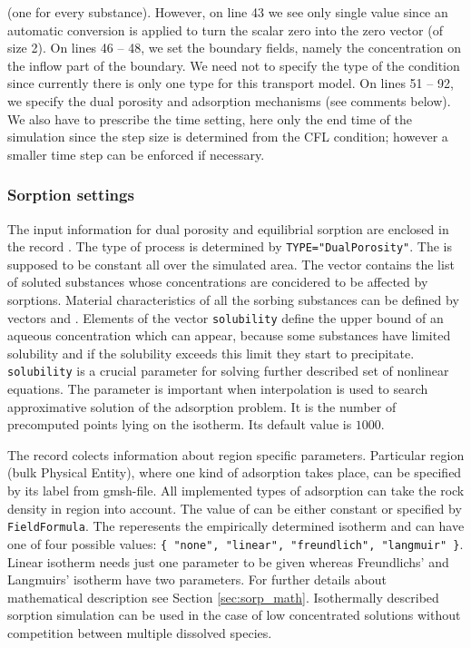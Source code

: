 \documentclass[12pt,a4paper]{report}
\begin{document}
(one for every substance). However, on line 43 we see only single value since an automatic conversion is applied to turn the scalar zero into the zero vector (of size 2). 
On lines 46 -- 48, we set the boundary fields, namely the concentration on the inflow part of the boundary.
We need not to specify the type of the condition since currently there is only one type for this transport model.
On lines 51 -- 92, we specify the dual porosity and adsorption mechanisms (see comments below).
We also have to prescribe the time setting, here only the end time of the simulation since the step size is determined from the CFL condition; however a smaller time step can be enforced if necessary.

\subsubsection{Sorption settings}\label{subsubsec:sorptions}
The input information for dual porosity and equilibrial sorption are enclosed in the record . The type of process is determined by {\tt TYPE="DualPorosity"}. The  is supposed to be constant all over the simulated area. The vector  contains the list of soluted substances whose concentrations are concidered to be affected by sorptions. Material characteristics of all the sorbing substances can be defined by vectors  and . Elements of the vector {\tt solubility} define the upper bound of an aqueous concentration which can appear, because some substances have limited solubility and if the solubility exceeds this limit they start to precipitate. {\tt solubility} is 
a crucial parameter for solving further described set of nonlinear equations. The parameter  is important when interpolation is used to search approximative solution of the adsorption problem. It is the number of precomputed points lying on the isotherm. Its default value is $1000$.

The record  colects information about region specific parameters. Particular region (bulk Physical Entity), where one kind of adsorption takes place, can be specified by its label from gmsh-file. All implemented types of adsorption can take the rock density in region into account. The value of  can be either constant or specified by {\tt FieldFormula}. The  reperesents the empirically determined isotherm and can have one of four possible values: {\tt \{ "none", "linear", "freundlich", "langmuir" \}}. Linear isotherm needs just one parameter to be given whereas Freundlichs' and Langmuirs' isotherm have two parameters. For further details about mathematical description see Section \ref{sec:sorp_math}. Isothermally described sorption simulation can be used in 
the case of low concentrated solutions without competition between multiple dissolved species.
\end{document}
